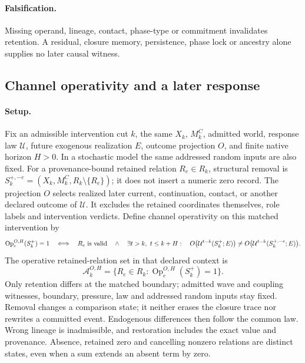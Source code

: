 \paragraph{Falsification.}
Missing operand, lineage, contact, phase-type or commitment invalidates retention.
A residual, closure memory, persistence, phase lock or ancestry alone supplies
no later causal witness.


\subsection{Channel operativity and a later response}
\label{subsec:active-awareness}
\paragraph{Setup.}
Fix an admissible intervention cut \(k\), the same \(X_k\), \(M^C_k\), admitted
world, response law \(\mathcal U\), future exogenous realization \(E\), outcome
projection \(O\), and finite native horizon \(H>0\). In a stochastic model the
same addressed random inputs are also fixed. For a provenance-bound retained
relation \(R_e\in R_k\), structural removal is
\(S_k^{+,-e}=(X_k,M^C_k,R_k\setminus\{R_e\})\); it does not insert a
numeric zero record. The projection \(O\) selects realized later current,
continuation, contact, or another declared outcome of \(\mathcal U\). It excludes
the retained coordinates themselves, role labels and intervention verdicts.
Define channel
operativity on this matched intervention by
\begin{equation}
 \operatorname{Op}^{O,H}_e(S_k^+)=1
 \quad\Longleftrightarrow\quad
 R_e\ \hbox{is valid}\quad\land\quad
 \exists t>k,\ t\le k+H:\quad
 O\bigl(\mathcal U^{t-k}(S_k^+;E)\bigr)
 \ne O\bigl(\mathcal U^{t-k}(S_k^{+,-e};E)\bigr).
 \label{eq:awareness-active}
\end{equation}
The operative retained-relation set in that declared context is
\begin{equation}
 \mathcal A_k^{O,H}=\{R_e\in R_k:
 \operatorname{Op}^{O,H}_e(S_k^+)=1\}.
 \label{eq:awareness-operative-set}
\end{equation}
Only retention differs at the matched boundary; admitted wave and coupling
witnesses, boundary, pressure, law and addressed random inputs stay fixed.
Removal changes a comparison state; it neither erases the closure trace nor
rewrites a committed event. Endogenous differences then follow the common law.
Wrong lineage is inadmissible, and restoration includes the exact
value and provenance. Absence, retained zero and cancelling nonzero relations
are distinct states, even when a sum extends an absent term by zero.

